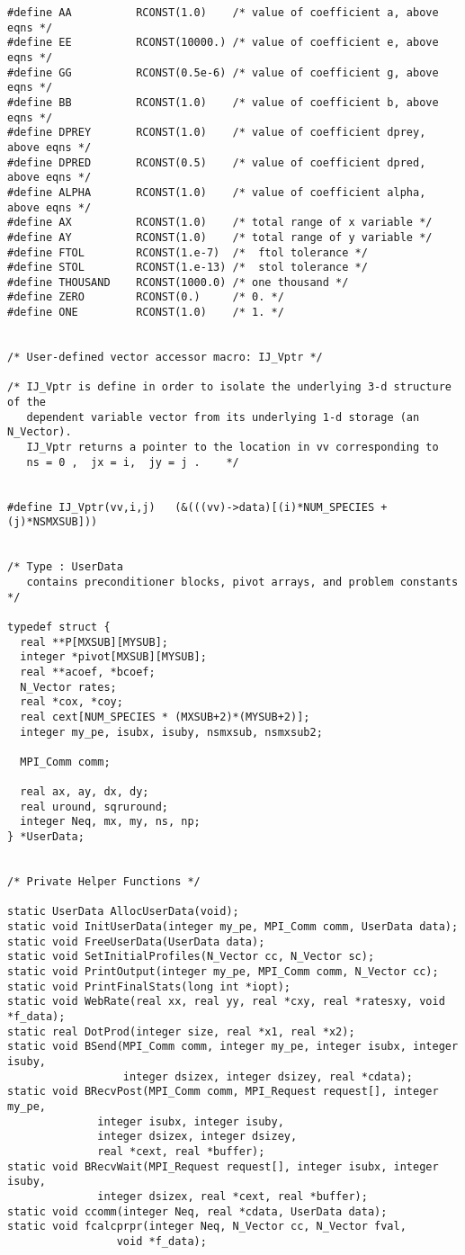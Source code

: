 \documentclass[11pt]{article}
\begin{document}
\begin{verbatim}
#define AA          RCONST(1.0)    /* value of coefficient a, above eqns */
#define EE          RCONST(10000.) /* value of coefficient e, above eqns */
#define GG          RCONST(0.5e-6) /* value of coefficient g, above eqns */
#define BB          RCONST(1.0)    /* value of coefficient b, above eqns */
#define DPREY       RCONST(1.0)    /* value of coefficient dprey, above eqns */
#define DPRED       RCONST(0.5)    /* value of coefficient dpred, above eqns */
#define ALPHA       RCONST(1.0)    /* value of coefficient alpha, above eqns */
#define AX          RCONST(1.0)    /* total range of x variable */
#define AY          RCONST(1.0)    /* total range of y variable */
#define FTOL        RCONST(1.e-7)  /*  ftol tolerance */
#define STOL        RCONST(1.e-13) /*  stol tolerance */
#define THOUSAND    RCONST(1000.0) /* one thousand */
#define ZERO        RCONST(0.)     /* 0. */
#define ONE         RCONST(1.0)    /* 1. */


/* User-defined vector accessor macro: IJ_Vptr */

/* IJ_Vptr is define in order to isolate the underlying 3-d structure of the 
   dependent variable vector from its underlying 1-d storage (an N_Vector).
   IJ_Vptr returns a pointer to the location in vv corresponding to 
   ns = 0 ,  jx = i,  jy = j .    */


#define IJ_Vptr(vv,i,j)   (&(((vv)->data)[(i)*NUM_SPECIES + (j)*NSMXSUB]))


/* Type : UserData 
   contains preconditioner blocks, pivot arrays, and problem constants */

typedef struct {
  real **P[MXSUB][MYSUB];
  integer *pivot[MXSUB][MYSUB];
  real **acoef, *bcoef;
  N_Vector rates;
  real *cox, *coy;
  real cext[NUM_SPECIES * (MXSUB+2)*(MYSUB+2)];
  integer my_pe, isubx, isuby, nsmxsub, nsmxsub2;

  MPI_Comm comm;
  
  real ax, ay, dx, dy;
  real uround, sqruround;
  integer Neq, mx, my, ns, np;
} *UserData;


/* Private Helper Functions */

static UserData AllocUserData(void);
static void InitUserData(integer my_pe, MPI_Comm comm, UserData data);
static void FreeUserData(UserData data);
static void SetInitialProfiles(N_Vector cc, N_Vector sc);
static void PrintOutput(integer my_pe, MPI_Comm comm, N_Vector cc);
static void PrintFinalStats(long int *iopt);
static void WebRate(real xx, real yy, real *cxy, real *ratesxy, void *f_data);
static real DotProd(integer size, real *x1, real *x2);
static void BSend(MPI_Comm comm, integer my_pe, integer isubx, integer isuby,
                  integer dsizex, integer dsizey, real *cdata);
static void BRecvPost(MPI_Comm comm, MPI_Request request[], integer my_pe,
              integer isubx, integer isuby,
              integer dsizex, integer dsizey,
              real *cext, real *buffer);
static void BRecvWait(MPI_Request request[], integer isubx, integer isuby,
              integer dsizex, real *cext, real *buffer);
static void ccomm(integer Neq, real *cdata, UserData data);
static void fcalcprpr(integer Neq, N_Vector cc, N_Vector fval, 
                 void *f_data);





\end{verbatim}
\end{document}
